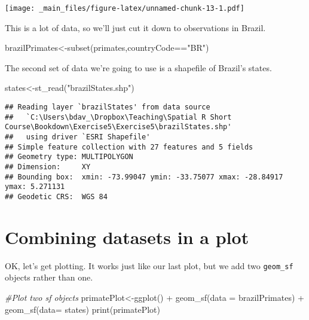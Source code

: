 \documentclass[
]{book}
\newenvironment{Shaded}{\begin{snugshade}}{\end{snugshade}}
\newcommand{\AttributeTok}[1]{\textcolor[rgb]{0.77,0.63,0.00}{#1}}
\newcommand{\CommentTok}[1]{\textcolor[rgb]{0.56,0.35,0.01}{\textit{#1}}}
\newcommand{\FunctionTok}[1]{\textcolor[rgb]{0.00,0.00,0.00}{#1}}
\newcommand{\NormalTok}[1]{#1}
\newcommand{\OtherTok}[1]{\textcolor[rgb]{0.56,0.35,0.01}{#1}}
\newcommand{\SpecialCharTok}[1]{\textcolor[rgb]{0.00,0.00,0.00}{#1}}
\newcommand{\StringTok}[1]{\textcolor[rgb]{0.31,0.60,0.02}{#1}}
\begin{document}
\texttt{[image: \_main\_files/figure-latex/unnamed-chunk-13-1.pdf]}

This is a lot of data, so we'll just cut it down to observations in Brazil.

\begin{Shaded}
\begin{Highlighting}[]
\NormalTok{brazilPrimates}\OtherTok{\textless{}{-}}\FunctionTok{subset}\NormalTok{(primates,countryCode}\SpecialCharTok{==}\StringTok{"BR"}\NormalTok{)}
\end{Highlighting}
\end{Shaded}

The second set of data we're going to use is a shapefile of Brazil's states.

\begin{Shaded}
\begin{Highlighting}[]
\NormalTok{states}\OtherTok{\textless{}{-}}\FunctionTok{st\_read}\NormalTok{(}\StringTok{"brazilStates.shp"}\NormalTok{)}
\end{Highlighting}
\end{Shaded}

\begin{verbatim}
## Reading layer `brazilStates' from data source 
##   `C:\Users\bdav_\Dropbox\Teaching\Spatial R Short Course\Bookdown\Exercise5\Exercise5\brazilStates.shp' 
##   using driver `ESRI Shapefile'
## Simple feature collection with 27 features and 5 fields
## Geometry type: MULTIPOLYGON
## Dimension:     XY
## Bounding box:  xmin: -73.99047 ymin: -33.75077 xmax: -28.84917 ymax: 5.271131
## Geodetic CRS:  WGS 84
\end{verbatim}

\hypertarget{combining-datasets-in-a-plot}{%
\section{Combining datasets in a plot}\label{combining-datasets-in-a-plot}}

OK, let's get plotting. It works just like our last plot, but we add two \texttt{geom\_sf} objects rather than one.

\begin{Shaded}
\begin{Highlighting}[]
\CommentTok{\#Plot two sf objects}
\NormalTok{primatePlot}\OtherTok{\textless{}{-}}\FunctionTok{ggplot}\NormalTok{() }\SpecialCharTok{+} 
  \FunctionTok{geom\_sf}\NormalTok{(}\AttributeTok{data =}\NormalTok{ brazilPrimates) }\SpecialCharTok{+}
  \FunctionTok{geom\_sf}\NormalTok{(}\AttributeTok{data=}\NormalTok{ states)}
\FunctionTok{print}\NormalTok{(primatePlot)}
\end{Highlighting}
\end{Shaded}
\end{document}
